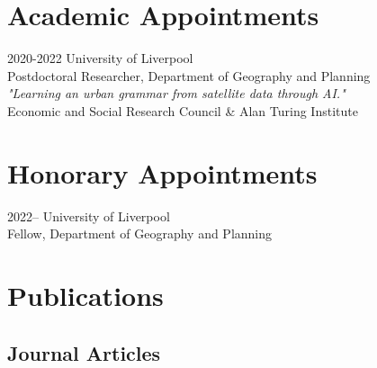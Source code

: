 \documentclass[12pt,a4paper]{report}
\begin{document}
    \section*{Academic Appointments}

    \begin{tablist}

        \item[2020-2022] \tab{}University of Liverpool \\
                            Postdoctoral Researcher, Department of Geography and Planning \\
                            \textit{"Learning an urban grammar from satellite data through AI."} \\
                            Economic and Social Research Council \& Alan Turing Institute

    \end{tablist}


    \section*{Honorary Appointments}

    \begin{tablist}

        \item[2022--] \tab{}University of Liverpool \\
                            Fellow, Department of Geography and Planning \\

    \end{tablist}

    \section*{Publications}

    \subsection*{Journal Articles}
\end{document}
